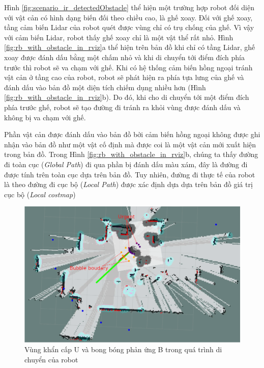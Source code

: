 Hình \ref{fig:scenario_ir_detectedObstacle} thể hiện một trường hợp robot đối diện với vật cản có hình dạng biến đối theo chiều cao, là ghế xoay. Đối với ghế xoay, tầng cảm biến Lidar của robot quét được vùng chỉ có trụ chống của ghế. Vì vậy với cảm biến Lidar, robot thấy ghế xoay chỉ là một vật thể rất nhỏ. Hình \ref{fig:rb_with_obstacle_in_rviz}a thể hiện trên bản đồ khi chỉ có tầng Lidar, ghế xoay được đánh dấu bằng một chấm nhỏ và khi di chuyển tới điểm đích phía trước thì robot sẽ va chạm với ghế. Khi có hệ thống cảm biến hồng ngoại tránh vật cản ở tầng cao của robot, robot sẽ phát hiện ra phía tựa lưng của ghế và đánh dấu vào bản đồ một diện tích chiếm dụng nhiều hơn (Hình \ref{fig:rb_with_obstacle_in_rviz}b). Do đó, khi cho di chuyển tới một điểm đích phía trước ghế, robot sẽ tạo đường đi tránh ra khỏi vùng được đánh dấu và không bị va chạm với ghế.

Phần vật cản được đánh dấu vào bản đồ bởi cảm biến hồng ngoại không được ghi nhận vào bản đồ như một vật cố định mà được coi là một vật cản mới xuất hiện trong bản đồ. Trong Hình \ref{fig:rb_with_obstacle_in_rviz}b, chúng ta thấy đường đi toàn cục (\textit{Global Path}) đi qua phần bị đánh dấu màu xám, đây là đường đi được tính trên toàn cục dựa trên bản đồ. Tuy nhiên, đường đi thực tế của robot là theo đường đi cục bộ (\textit{Local Path}) được xác định dựa dựa trên bản đồ giá trị cục bộ (\textit{Local costmap})

\begin{figure}[htbp]
    \centering
    \includegraphics[width=0.9\linewidth]{figures/RB_bb_urgent.png}
    \caption{Vùng khẩn cấp U và bong bóng phản ứng B trong quá trình di chuyển của robot}
    \label{fig:bb_urgent}
\end{figure}

